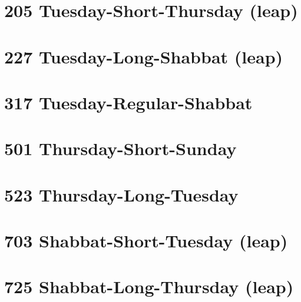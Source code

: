 \toggletrue{leapyear}
\section{205 Tuesday-Short-Thursday (leap)}
\label{205}
\tishreiTues

\section{227 Tuesday-Long-Shabbat (leap)}
\label{227}
\tishreiTues

\section{317 Tuesday-Regular-Shabbat}
\label{317}
\tishreiTues

\section{501 Thursday-Short-Sunday}
\label{501}
\tishreiThurs

\section{523 Thursday-Long-Tuesday}
\label{523}
\tishreiThurs


\section{703 Shabbat-Short-Tuesday (leap)}
\label{703}
\tishreiShab
{}
\kislevTues

\section{725 Shabbat-Long-Thursday (leap)}
\label{725}
\tishreiShab
{}